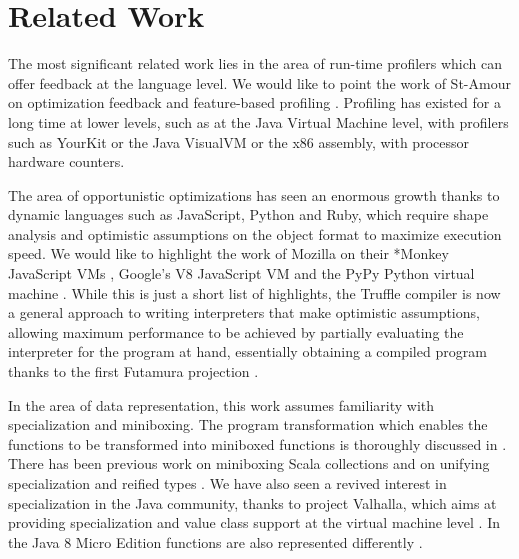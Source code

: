 \section{Related Work}
\label{mbox2:sec:related}



The most significant related work lies in the area of run-time profilers which can offer feedback at the language level. We would like to point the work of St-Amour on optimization feedback \cite{st-amour-opt-coaching} and feature-based profiling \cite{st-amour-feature-specific-profiling}. Profiling has existed for a long time at lower levels, such as at the Java Virtual Machine level, with profilers such as YourKit \cite{yourkit} or the Java VisualVM \cite{visualvm} or the x86 assembly, with processor hardware counters.

The area of opportunistic optimizations has seen an enormous growth thanks to dynamic languages such as JavaScript, Python and Ruby, which require shape analysis and optimistic assumptions on the object format to maximize execution speed. We would like to highlight the work of Mozilla on their *Monkey JavaScript VMs \cite{tracemonkey}, Google's V8 JavaScript VM and the PyPy Python virtual machine \cite{bolz-pypy-tracing-jit,bolz-python-strategies}. While this is just a short list of highlights, the Truffle compiler \cite{truffle,graal} is now a general approach to writing interpreters that make optimistic assumptions, allowing maximum performance to be achieved by partially evaluating the interpreter for the program at hand, essentially obtaining a compiled program thanks to the first Futamura projection \cite{futamura-projection}.

In the area of data representation, this work assumes familiarity with specialization \cite{iuli-thesis} and miniboxing. The program transformation which enables the functions to be transformed into miniboxed functions is thoroughly discussed in \cite{ldl, ildl-tech}. There has been previous work on miniboxing Scala collections \cite{miniboxing-linkedlist,biboudis-streams,nicolas-rrbvectors} and on unifying specialization and reified types \cite{bridging}. We have also seen a revived interest in specialization in the Java community, thanks to project Valhalla, which aims at providing specialization and value class support at the virtual machine level \cite{rose-value-classes-tearing, goetz-specialization}. In the Java 8 Micro Edition functions are also represented differently \cite{j2me-functions}.


